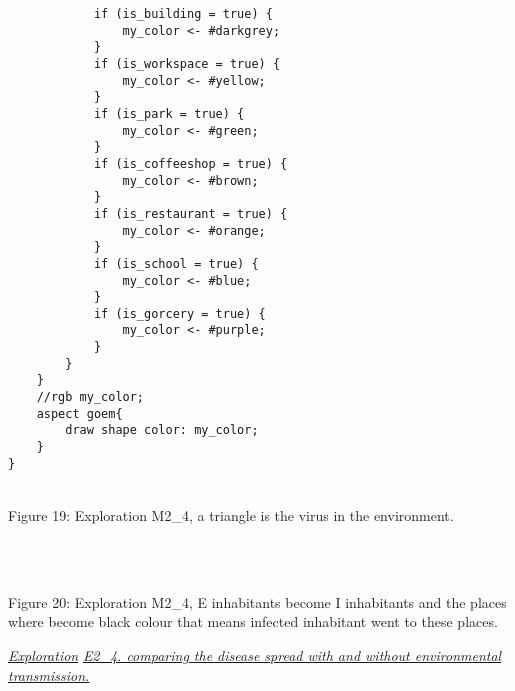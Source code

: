 \documentclass{article}
\begin{document}
\begin{pic15}
\begin{pic15}
\begin{tcolorbox}
\begin{lstlisting}
			if (is_building = true) {
				my_color <- #darkgrey;
			}			
			if (is_workspace = true) {
				my_color <- #yellow;
			}	
			if (is_park = true) {
				my_color <- #green;
			}	
			if (is_coffeeshop = true) {
				my_color <- #brown;
			}	
			if (is_restaurant = true) {
				my_color <- #orange;
			}			
			if (is_school = true) {
				my_color <- #blue;
			}
			if (is_gorcery = true) {
				my_color <- #purple;
			}
		}
	}
	//rgb my_color;
	aspect goem{
		draw shape color: my_color;
	}
}
\end{lstlisting}
\end{tcolorbox}
\newline\newline

\begin{pic19}
\\
\caption{Figure 19: Exploration M2\_4, a triangle is the virus in the environment.} 
\end{pic19}
\\
\begin{pic20}
\\
\caption{Figure 20: Exploration M2\_4, E inhabitants become I inhabitants and the places where become black colour that means infected inhabitant went to these places.} 
\end{pic20}
\newpage
\underline{\emph{Exploration}}
\newline\newline
\underline{\textit{E2\_4. comparing the disease spread with and without environmental transmission.}}


\end{pic15}
\end{pic15}
\end{document}
